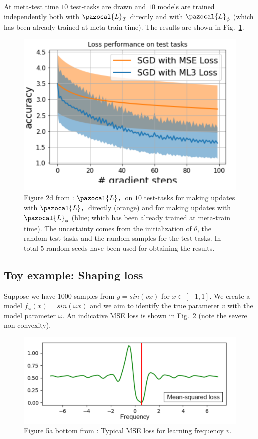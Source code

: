 At meta-test time $10$ test-tasks are drawn and $10$ models are trained independently both with $\pazocal{L}_{T}$ directly and with $\pazocal{L}_{\phi}$ (which has been already trained at meta-train time).
The results are shown in Fig.~\ref{fig:fig2d}. 
\begin{figure}[H]
	\centering
	\includegraphics[width=0.65\linewidth]{./Figures/fig2d.png}
	\caption{Figure 2d from \textcite{bechtle2020metalearning}: $\pazocal{L}_{T}$ on $10$ test-tasks for making updates with $\pazocal{L}_{T}$ directly (orange) and for making updates with $\pazocal{L}_{\phi}$ (blue; which has been already trained at meta-train time).
	The uncertainty comes from the initialization of $\theta$, the random test-tasks and the random samples for the test-tasks. 
	In total $5$ random seeds have been used for obtaining the results.}
	\label{fig:fig2d}
\end{figure}	 

\subsection{Toy example: Shaping loss}

Suppose we have $1000$ samples from $y=sin(vx)$ for $x \in [-1,1]$.
We create a model $f_{\omega}(x) = sin(\omega x)$ and we aim to identify the true parameter $v$ with the model parameter $\omega$.
An indicative MSE loss is shown in Fig.~\ref{fig:fig5ab} (note the severe non-convexity).
\begin{figure}[H]
	\centering
	\includegraphics[width=0.7\linewidth]{./Figures/fig5ab.png}
	\caption{Figure 5a bottom from \textcite{bechtle2020metalearning}: Typical MSE loss for learning frequency $v$.}
	\label{fig:fig5ab}
\end{figure}	

